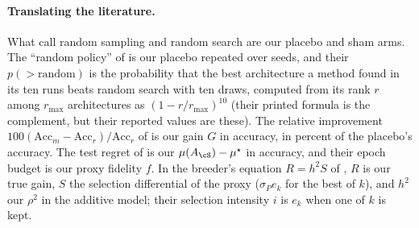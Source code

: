 \begin{refsection}
\paragraph{Translating the literature.} What \textcite{LindauerHutter2020} call random sampling and random search are our placebo and sham arms. The ``random policy'' of \textcite{YuEtAl2020} is our placebo repeated over seeds, and their $p(>\mathrm{random})$ is the probability that the best architecture a method found in its ten runs beats random search with ten draws, computed from its rank $r$ among $r_{\max}$ architectures as $(1-r/r_{\max})^{10}$ (their printed formula is the complement, but their reported values are these). The relative improvement $100(\mathrm{Acc}_m-\mathrm{Acc}_r)/\mathrm{Acc}_r$ of \textcite{YangEsperancaCarlucci2020} is our gain $G$ in accuracy, in percent of the placebo's accuracy. The test regret of \textcite{YingEtAl2019} is our $\mu(A_{\cS})-\mu^\star$ in accuracy, and their epoch budget is our proxy fidelity $f$. In the breeder's equation $R=h^2S$ of \textcite{FalconerMackay1996}, $R$ is our true gain, $S$ the selection differential of the proxy ($\sigma_Pe_k$ for the best of $k$), and $h^2$ our $\rho^2$ in the additive model; their selection intensity $i$ is $e_k$ when one of $k$ is kept.

\printchapterbib
\end{refsection}
